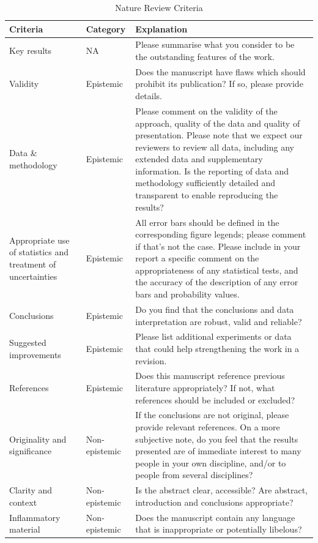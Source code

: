 \documentclass{book}
\begin{document}
\begin{table}[H]
\centering
\begin{tabularx}{\textwidth}{|X|X|X|}
\hline
\textbf{Criteria} & \textbf{Category} & \textbf{Explanation} \\ 
\hline
Key results & NA & Please summarise what you consider to be the outstanding features of the work. \\ 
\hline
Validity & Epistemic & Does the manuscript have flaws which should prohibit its publication? If so, please provide details. \\ 
\hline
Data \& methodology & Epistemic & Please comment on the validity of the approach, quality of the data and quality of presentation. Please note that we expect our reviewers to review all data, including any extended data and supplementary information. Is the reporting of data and methodology sufficiently detailed and transparent to enable reproducing the results? \\ 
\hline
Appropriate use of statistics and treatment of uncertainties & Epistemic & All error bars should be defined in the corresponding figure legends; please comment if that’s not the case. Please include in your report a specific comment on the appropriateness of any statistical tests, and the accuracy of the description of any error bars and probability values. \\ 
\hline
Conclusions & Epistemic & Do you find that the conclusions and data interpretation are robust, valid and reliable? \\ 
\hline
Suggested improvements & Epistemic & Please list additional experiments or data that could help strengthening the work in a revision. \\ 
\hline
References & Epistemic & Does this manuscript reference previous literature appropriately? If not, what references should be included or excluded? \\ 
\hline
Originality and significance & Non-epistemic & If the conclusions are not original, please provide relevant references. On a more subjective note, do you feel that the results presented are of immediate interest to many people in your own discipline, and/or to people from several disciplines? \\ 
\hline
Clarity and context & Non-epistemic & Is the abstract clear, accessible? Are abstract, introduction and conclusions appropriate? \\ 
\hline
Inflammatory material & Non-epistemic & Does the manuscript contain any language that is inappropriate or potentially libelous? \\ 
\hline
\end{tabularx}
\caption{Nature Review Criteria}
\label{tab:nature_review}
\end{table}
\end{document}
